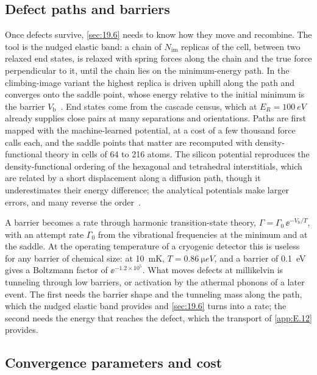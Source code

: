 \subsection{Defect paths and barriers}

Once defects survive, \cref{sec:19.6} needs to know how they move and recombine. The tool is the nudged elastic band: a chain of $N_{\mathrm{im}}$ replicas of the cell, between two relaxed end states, is relaxed with spring forces along the chain and the true force perpendicular to it, until the chain lies on the minimum-energy path. In the climbing-image variant the highest replica is driven uphill along the path and converges onto the saddle point, whose energy relative to the initial minimum is the barrier $V_{\mathrm{b}}$~\cite{henkelman2000climbing}. End states come from the cascade census, which at $E_R = \SI{100}{eV}$ already supplies close pairs at many separations and orientations. Paths are first mapped with the machine-learned potential, at a cost of a few thousand force calls each, and the saddle points that matter are recomputed with density-functional theory in cells of 64 to 216 atoms. The silicon potential reproduces the density-functional ordering of the hexagonal and tetrahedral interstitials, which are related by a short displacement along a diffusion path, though it underestimates their energy difference; the analytical potentials make larger errors, and many reverse the order~\cite[Sect.~III\,E]{bartok2018machine}.

A barrier becomes a rate through harmonic transition-state theory, $\varGamma = \varGamma_0\,\ee^{-V_{\mathrm{b}}/T}$, with an attempt rate $\varGamma_0$ from the vibrational frequencies at the minimum and at the saddle. At the operating temperature of a cryogenic detector this is useless for any barrier of chemical size: at \SI{10}{mK}, $T = \SI{0.86}{\micro eV}$, and a barrier of \SI{0.1}{eV} gives a Boltzmann factor of $\ee^{-1.2\times10^5}$. What moves defects at millikelvin is tunneling through low barriers, or activation by the athermal phonons of a later event. The first needs the barrier shape and the tunneling mass along the path, which the nudged elastic band provides and \cref{sec:19.6} turns into a rate; the second needs the energy that reaches the defect, which the transport of \cref{app:E.12} provides.

\subsection{Convergence parameters and cost}

